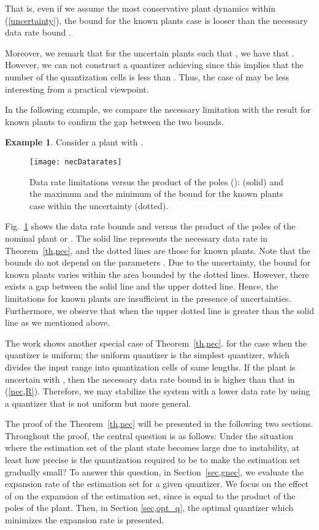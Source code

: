 \documentclass[a4paper, 11pt]{article}
\theoremstyle{definition}
\newtheorem{exmp}{Example}
\newcommand{\fref}[1]{Fig.~\ref{#1}}
\begin{document}
That is, even if we assume the most conservative plant dynamics within
(\ref{uncertainty}), the bound for the known plants case is looser than the
necessary data rate bound .

Moreover, we remark that for the uncertain plants such that ,
we have that .
However, we can not construct a quantizer achieving  since this implies
that the number of the quantization cells  is less than .
Thus, the case of  may be less interesting from a practical viewpoint.


In the following example, we compare the necessary limitation  with
the result for known plants to confirm the gap between the two bounds.
\begin{exmp}\label{ex,neccomparison}
 Consider a plant with .
\begin{figure}[t]
 \centering
 \texttt{[image: necDatarates]}
 \caption{Data rate limitations versus the product of the poles 
 ():
  (solid) and the maximum and the minimum of the bound 
 for the known plants case within the uncertainty (dotted).}
 \label{fig,nec_comparison}
\end{figure}
\fref{fig,nec_comparison} shows the data rate bounds  and 
versus the product of the poles  of the nominal plant or .
The solid line represents the necessary data rate in Theorem~\ref{th,nec},
and the dotted lines are those for known plants.
Note that the bounds do not depend on the parameters .
Due to the uncertainty, the bound for known plants varies within the area
bounded by the dotted lines.
However, there exists a gap between the solid line and the upper dotted line.
Hence, the limitations for known plants are insufficient in the presence of
uncertainties.
Furthermore, we observe that when  the upper dotted line is greater
than the solid line as we mentioned above.
\end{exmp}



The work \cite{Okano2012} shows another special case of Theorem~\ref{th,nec}.
for the case when the quantizer is uniform;
the uniform quantizer is the simplest
quantizer, which divides the input range into quantization cells of same lengths.
If the plant is uncertain with , then the necessary data rate
bound in \cite{Okano2012} is higher than that in (\ref{nec,R}).
Therefore, we may stabilize the system with a lower data rate by using
a quantizer that is not uniform but more general.


The proof of the Theorem~\ref{th,nec} will be presented in the following
two sections.
Throughout the proof, the central question is as follows:
Under the situation where the estimation set of the plant state becomes
large due to instability, at least how precise is the quantization
required to be to make the estimation set gradually small?
To answer this question, in Section~\ref{sec,gnec}, we evaluate the expansion
rate of the estimation set for a given quantizer.
We focus on the effect of  on the expansion of the estimation set,
since  is equal to the product of the poles of the plant.
Then, in Section \ref{sec,opt_q}, the optimal quantizer which minimizes
the expansion rate is presented.
\end{document}
